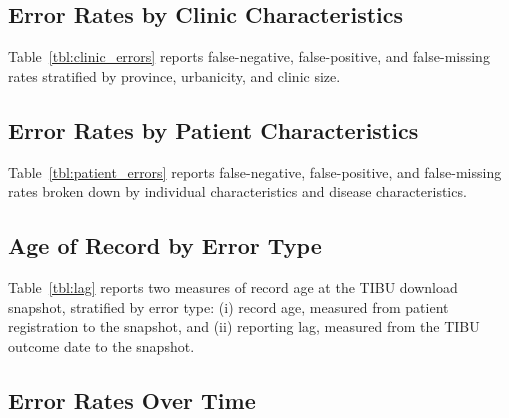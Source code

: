 \documentclass[12pt]{article}
\begin{document}
\subsection{Error Rates by Clinic Characteristics}

Table~\ref{tbl:clinic_errors} reports false-negative, false-positive, and false-missing rates stratified by province, urbanicity, and clinic size.

\begin{table}[H]
    \centering
    \caption{DQA error rates by province, urbanicity, and clinic size.}
    \label{tbl:clinic_errors}
    \resizebox{\textwidth}{!}{}
\end{table}

\subsection{Error Rates by Patient Characteristics}

Table~\ref{tbl:patient_errors} reports false-negative, false-positive, and
false-missing rates broken down by individual characteristics and disease
characteristics.

\begin{table}[H]
    \centering
    \caption{DQA error rates by individual and disease characteristics.}
    \label{tbl:patient_errors}
    \resizebox{\textwidth}{!}{}
\end{table}

\subsection{Age of Record by Error Type}

Table~\ref{tbl:lag} reports two measures of record age at the TIBU download
snapshot, stratified by error type: (i) record age, measured from patient
registration to the snapshot, and (ii) reporting lag, measured from the TIBU
outcome date to the snapshot.

\begin{table}[H]
    \centering
    \caption{Record age and reporting lag (days) at the TIBU snapshot, by error category.}
    \label{tbl:lag}
    
\end{table}

\subsection{Error Rates Over Time}
\end{document}
